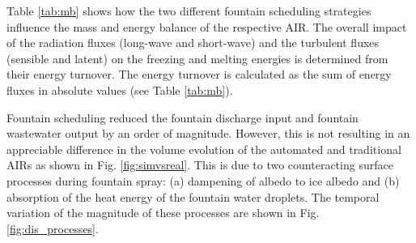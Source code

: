 

Table \ref{tab:mb} shows how the two different fountain scheduling strategies influence the mass and energy balance
of the respective AIR.  The overall impact of the radiation fluxes (long-wave and short-wave) and the
turbulent fluxes (sensible and latent) on the freezing and melting energies is determined from their 
energy turnover. The energy turnover is calculated as the sum of energy fluxes in absolute values (see Table
\ref{tab:mb}). 

Fountain scheduling reduced the fountain discharge input and fountain wastewater output by an order of
magnitude. However, this is not resulting in an appreciable difference in the volume evolution of the automated
and traditional AIRs as shown in Fig. \ref{fig:simvsreal}. This is due to two counteracting surface processes
during fountain spray: (a) dampening of albedo to ice albedo and (b) absorption of the heat energy of the
fountain water droplets. The temporal variation of the magnitude of these processes are shown in Fig.
\ref{fig:dis_processes}.

